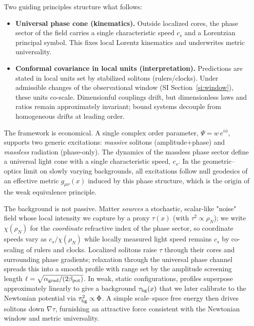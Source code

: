 \documentclass[11pt]{article}
\begin{document}
Two guiding principles structure what follows:
\begin{itemize}[leftmargin=*]
  \item \textbf{Universal phase cone (kinematics).} Outside localized cores, the phase sector of the field carries a single characteristic speed $c_s$ and a Lorentzian principal symbol. This fixes local Lorentz kinematics and underwrites metric universality.
  \item \textbf{Conformal covariance in local units (interpretation).} Predictions are stated in local units set by stabilized solitons (rulers/clocks). Under admissible changes of the observational window (SI Section~\ref{si:window}), these units co-scale. Dimensionful couplings drift, but dimensionless laws and ratios remain approximately invariant; bound systems decouple from homogeneous drifts at leading order.
\end{itemize}

The framework is economical. A single complex order parameter, $\Psi=w\,e^{i\phi}$, supports two generic excitations: \emph{massive} solitons (amplitude+phase) and \emph{massless} radiation (phase-only). The dynamics of the massless phase sector define a universal light cone with a single characteristic speed, $c_s$. In the geometric--optics limit on slowly varying backgrounds, all excitations follow null geodesics of an effective metric $g_{\mu\nu}(x)$ induced by this phase structure, which is the origin of the weak equivalence principle.

The background is not passive. Matter \emph{sources} a stochastic, scalar-like "noise" field whose local intensity we capture by a proxy $\tau(x)$ (with $\tau^2\propto\rho_N$); we write $\chi(\rho_N)$ for the \emph{coordinate} refractive index of the phase sector, so coordinate speeds vary as $c_s/\chi(\rho_N)$ while locally measured light speed remains $c_s$ by co-scaling of rulers and clocks. Localized solitons raise $\tau$ through their cores and surrounding phase gradients; relaxation through the universal phase channel spreads this into a smooth profile with range set by the amplitude screening length $\ell=\sqrt{\alpha_{\rm grad}/(2\beta_{\rm pot})}$. In weak, static configurations, profiles superpose approximately linearly to give a background $\tau_{\rm bg}(x)$ that we later calibrate to the Newtonian potential via $\tau_{\rm bg}^2\propto\Phi$. A simple scale–space free energy then drives solitons down $\nabla\tau$, furnishing an attractive force consistent with the Newtonian window and metric universality.
\end{document}
